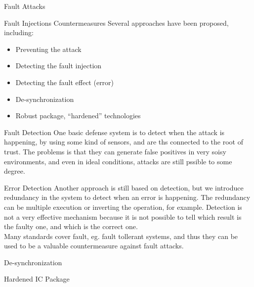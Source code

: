 \begin{chapter}{Fault Attacks}
  \begin{section}{Fault Injections Countermeasures}
    Several approaches have been proposed, including:
    \begin{itemize}
      \item Preventing the attack
      \item Detecting the fault injection
      \item Detecting the fault effect (error)
      \item De-synchronization
      \item Robust package, “hardened” technologies
    \end{itemize}

    \begin{subsection}{Fault Detection}
      One basic defense system is to detect when the attack is happening, by using some kind of
      sensors, and are ths connected to the root of trust. The problems is that they can generate
      false positives in very soisy environments, and even in ideal conditions, attacks are still
      pssible to some degree.
    \end{subsection}

    \begin{subsection}{Error Detection}
      Another approach is still based on detection, but we introduce redundancy in the system to
      detect when an error is happening. The redundancy can be multiple execution or inverting the
      operation, for example. Detection is not a very effective mechanism because it is not possible
      to tell which result is the faulty one, and which is the correct one.\\
      Many standards cover fault, eg. fault tollerant systems, and thus they can be used to be a
      valuable countermeasure against fault attacks.
    \end{subsection}

    \begin{subsection}{De-synchronization}

    \end{subsection}
    \begin{subsection}{Hardened IC Package}

    \end{subsection}
  \end{section}

\end{chapter}
